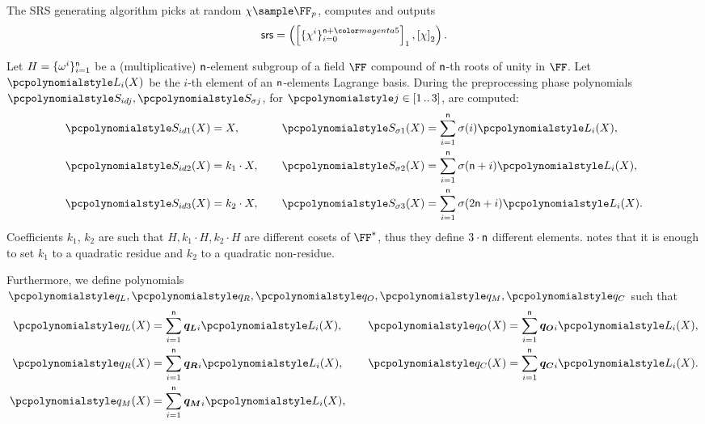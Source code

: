 The SRS generating algorithm picks at random $\chi \sample \FF_p$, computes
and outputs
\[
	\srs = \left(\gone{\smallset{\chi^i}_{i = 0}^{\numberofconstrains + \changedm{5}}},
	\gtwo{\chi} \right).
\]

Let $H = \{\omega^i\}_{i = 1}^{\mathsf{n} }$ be a
(multiplicative) $\mathsf{n}$-element subgroup of a field $\FF$
compound of $\mathsf{n}$-th roots of unity in $\FF$. Let $\lag_i(X)$ be
the $i$-th element of an $\mathsf{n}$-elements Lagrange basis. During
the preprocessing phase polynomials $\p{S_{id j}}, \p{S_{\sigma j}}$, for
$\p{j} \in \range{1}{3}$, are computed:
\begin{equation*}
  \begin{aligned}
    \p{S_{id 1}}(X) & = X,\vphantom{\sum_{i = 1}^{\noofc} \sigma(i) \lag_i(X),}\\
    \p{S_{id 2}}(X) & = k_1 \cdot X,\vphantom{\sum_{i = 1}^{\noofc} \sigma(i) \lag_i(X),}\\
    \p{S_{id 3}}(X) & = k_2 \cdot X,\vphantom{\sum_{i = 1}^{\noofc} \sigma(i) \lag_i(X),}
  \end{aligned}
  \qquad
\begin{aligned}
  \p{S_{\sigma 1}}(X) & = \sum_{i = 1}^{\noofc} \sigma(i) \lag_i(X),\\
  \p{S_{\sigma 2}}(X) & = \sum_{i = 1}^{\noofc}
  \sigma(\noofc + i) \lag_i(X),\\
  \p{S_{\sigma 3}}(X) & =\sum_{i = 1}^{\noofc} \sigma(2 \noofc + i) \lag_i(X).
\end{aligned}
\end{equation*}
Coefficients $k_1$, $k_2$ are such that $H, k_1 \cdot H, k_2 \cdot H$ are
different cosets of $\FF^*$, thus they define $3 \cdot \mathsf{n}$
different elements. \cite{EPRINT:GabWilCio19} notes that it is enough to set
$k_1$ to a quadratic residue and $k_2$ to a quadratic non-residue.

Furthermore, we define polynomials $\p{q_L}, \p{q_R}, \p{q_O}, \p{q_M}, \p{q_C}$
such that
\begin{equation*}
  \begin{aligned}
  \p{q_L}(X) & = \sum_{i = 1}^{\noofc} \vql_i \lag_i(X), \\
  \p{q_R}(X) & = \sum_{i = 1}^{\noofc} \vqr_i \lag_i(X), \\
  \p{q_M}(X) & = \sum_{i = 1}^{\noofc} \vqm_i \lag_i(X),
\end{aligned}
\qquad
\begin{aligned}
  \p{q_O}(X) & = \sum_{i = 1}^{\noofc} \vqo_i \lag_i(X), \\
  \p{q_C}(X) & = \sum_{i = 1}^{\noofc} \vqc_i \lag_i(X). \\
  \vphantom{\p{q_M}(X)  = \sum_{i = 1}^{\noofc} \vqm_i \lag_i(X),}
\end{aligned}
\end{equation*}

